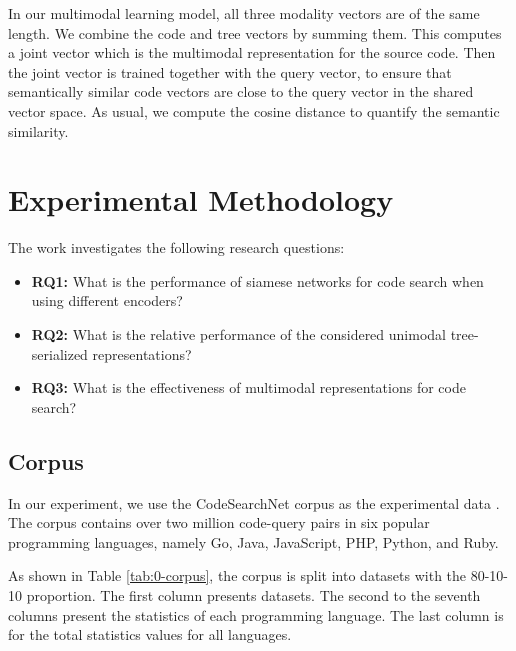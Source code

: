 \documentclass[conference]{IEEEtran}
\begin{document}
In our multimodal learning model, all three modality vectors are of the same length. We combine the code and tree vectors by summing them. This computes a joint vector which is the multimodal representation for the source code. Then the joint vector is trained together with the query vector, to ensure that semantically similar code vectors are close to the query vector in the shared vector space. As usual, we compute the cosine distance to quantify the semantic similarity.
 \section{Experimental Methodology}
\label{sec:methodology}

The work investigates the following research questions:

\newcommand\rqaaa{What is the performance of siamese networks for code search when using different encoders?}
\newcommand\rqbbb{What is the relative performance of the considered unimodal tree-serialized representations?}
\newcommand\rqccc{What is the effectiveness of multimodal representations for code search?}

\begin{itemize}
  \item \textbf{RQ1:} \rqaaa
  \item \textbf{RQ2:} \rqbbb
  \item \textbf{RQ3:} \rqccc
\end{itemize}

\subsection{Corpus}

In our experiment, we use the CodeSearchNet corpus as the experimental data \cite{Husain2019CodeSearchNetCE}. The corpus contains over two million code-query pairs in six popular programming languages, namely Go, Java, JavaScript, PHP, Python, and Ruby.

As shown in Table \ref{tab:0-corpus}, the corpus is split into datasets with the 80-10-10 proportion. The first column presents datasets. The second to the seventh columns present the statistics of each programming language. The last column is for the total statistics values for all languages.
\end{document}
